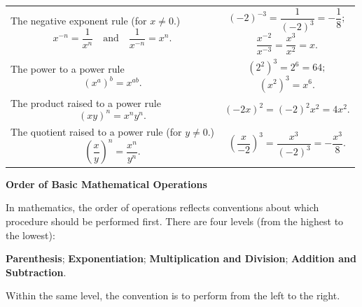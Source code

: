 \documentclass[en,11pt]{elegantbook}
\newcommand{\size}[2]{{\fontsize{#1}{0}\selectfont#2}}
\newenvironment{rmdnote}{
	\vspace*{0.5\baselineskip}
    \par\noindent
    \makebox[-3pt][r]{\color{red!90}\size{8}{\textdbend}\,\,}
    \begin{tcolorbox}[
    title={\textbf{\color{second}Note}},
    title style={left color=blue!10!green!20!white,right color=yellow!20!blue!20!white},
    colback=red!10!white,
    ]
    \itshape
}{
    \end{tcolorbox}
    \par\ignorespacesafterend
}
\begin{document}
\begin{longtable}[]{@{}ll@{}}
\begin{minipage}[t]{0.47\columnwidth}
The negative exponent rule (for \(x\neq 0\).) \[x^{-n}=\dfrac{1}{x^n} \quad\text{and}\quad \dfrac{1}{x^{-n}}=x^n.\]\strut
\end{minipage} & \begin{minipage}[t]{0.47\columnwidth}\raggedright
\[(-2)^{-3}=\frac{1}{(-2)^3}=-\frac18;\] \[\frac{x^{-2}}{x^{-3}}=\frac{x^3}{x^2}=x.\]\strut
\end{minipage}\tabularnewline
\begin{minipage}[t]{0.47\columnwidth}\raggedright
The power to a power rule \[\left(x^a\right)^b=x^{ab}.\]\strut
\end{minipage} & \begin{minipage}[t]{0.47\columnwidth}\raggedright
\[\left(2^{2}\right)^3=2^6=64;\] \[\left(x^2\right)^3=x^6.\]\strut
\end{minipage}\tabularnewline
\begin{minipage}[t]{0.47\columnwidth}\raggedright
The product raised to a power rule \[(xy)^n=x^ny^n.\]\strut
\end{minipage} & \begin{minipage}[t]{0.47\columnwidth}\raggedright
\[\left(-2x\right)^{2}=(-2)^2x^2=4x^2.\]\strut
\end{minipage}\tabularnewline
\begin{minipage}[t]{0.47\columnwidth}\raggedright
The quotient raised to a power rule (for \(y\neq 0\).) \[\left(\dfrac{x}{y}\right)^n=\dfrac{x^n}{y^n}.\]\strut
\end{minipage} & \begin{minipage}[t]{0.47\columnwidth}\raggedright
\[    \left(\dfrac{x}{-2}\right)^{3}=\dfrac{x^3}{(-2)^3}=-\dfrac{x^3}{8}.\]\strut
\end{minipage}\tabularnewline
\bottomrule
\end{longtable}

\begin{rmdnote}

\textbf{Order of Basic Mathematical Operations}

In mathematics, the order of operations reflects conventions about which procedure should be performed first. There are four levels (from the highest to the lowest):

\textbf{Parenthesis}; \textbf{Exponentiation}; \textbf{Multiplication and Division}; \textbf{Addition and Subtraction}.

Within the same level, the convention is to perform from the left to the right.

\end{rmdnote}
\end{document}
